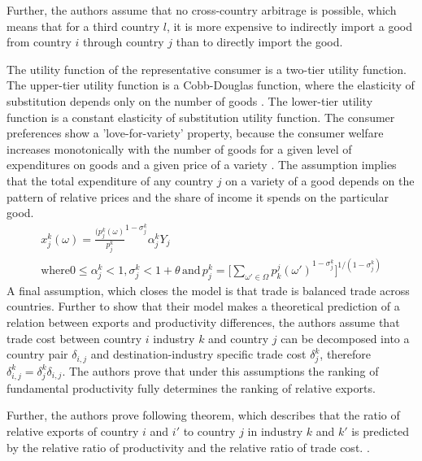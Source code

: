  Further, the authors assume that no cross-country arbitrage is possible, which means that for a third country $l$, it is more expensive to indirectly import a good from  country $i$ through  country $j$ than to directly import the good.  \par %
The utility function of the representative consumer is a two-tier utility function. The upper-tier utility function is a Cobb-Douglas function, where the elasticity of substitution depends only on the number of goods \parencite[p. 129]{helpman}.  The lower-tier utility function is a constant elasticity of substitution utility function.%
The consumer preferences show a 'love-for-variety' property, because the consumer welfare increases monotonically with the number of goods  for a given level of expenditures on goods and a given price of a variety  \textcite[p. 118]{helpman}. The assumption implies that the total expenditure of any country $j$ on a variety of a good depends on the pattern of relative prices and the share of income it spends on the particular good.
\begin{align*}
x^k_{j}(\omega)= \frac{(p^k_{j}(\omega) } {p^k_{j} }^{1-\sigma_{j}^k}  \alpha^k_j Y_j \\ \text{where} 0 \leq \alpha_j^k < 1,\sigma_{j}^k < 1+\theta \, \text{and} \, {p^k_{j} =[ \sum_{\omega' \in \Omega} p_k^j (\omega')}^{1-\sigma_j^k}]^{1/({1-\sigma_j^k})    }
\end{align*}  %
A final assumption, which closes the model is that  trade is balanced trade across countries. 
Further to show that their model makes a theoretical prediction of a relation between exports and productivity differences, the authors assume that trade cost between country $i$ industry $k$ and country $j$  can be decomposed into a country pair $\delta_{i,j}$ and destination-industry specific trade cost $\delta^k_j $, therefore $\delta^k_{i,j}=\delta^k_j \delta_{i,j}$. The authors prove that under this assumptions the ranking of fundamental productivity fully determines the ranking of relative exports. 
\par
 Further, the authors prove following theorem, which describes that the ratio of relative exports of country $i$ and $i'$ to country $j$ in industry $k$ and $k'$ is predicted by the relative ratio of productivity and the relative ratio of trade cost. \parencite{costinot}.
